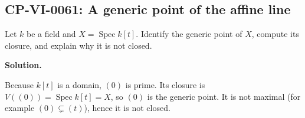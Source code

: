 
\subsection*{CP-VI-0061: A generic point of the affine line}

Let $k$ be a field and $X=\operatorname{Spec}k[t]$. Identify the generic point of $X$, compute its closure, and explain why it is not closed.

\medskip
\noindent\textbf{Solution.}

Because $k[t]$ is a domain, $(0)$ is prime. Its closure is $V((0))=\operatorname{Spec}k[t]=X$, so $(0)$ is the generic point. It is not maximal (for example $(0)\subsetneq(t)$), hence it is not closed.
